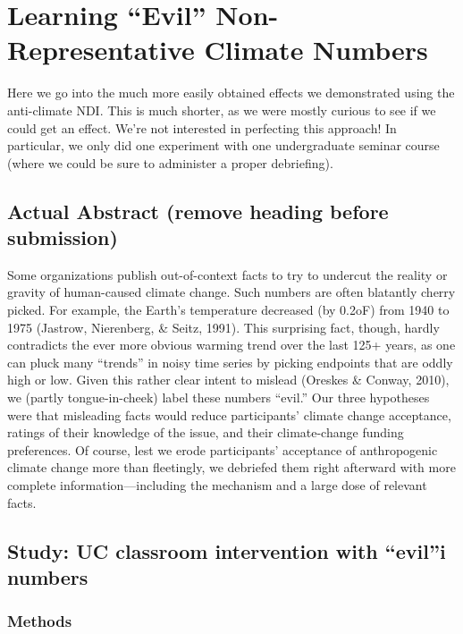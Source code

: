 \graphicspath{{evil-ndi/}}

\chapter{Learning \texorpdfstring{``Evil''}{"Evil"} Non-Representative Climate Numbers}
\label{chap:evilndi}

Here we go into the much more easily obtained effects we demonstrated using the
anti-climate NDI. This is much shorter, as we were mostly curious to see if we
could get an effect. We're not interested in perfecting this approach! In
particular, we only did one experiment with one undergraduate seminar course
(where we could be sure to administer a proper debriefing).

\section{Actual Abstract (remove heading before submission)}

Some organizations publish out-of-context facts to try to undercut the reality
or gravity of human-caused climate change. Such numbers are often blatantly
cherry picked. For example, the Earth’s temperature decreased (by 0.2oF) from
1940 to 1975 (Jastrow, Nierenberg, \& Seitz, 1991). This surprising fact, though,
hardly contradicts the ever more obvious warming trend over the last 125+ years,
as one can pluck many ``trends'' in noisy time series by picking endpoints that
are oddly high or low. Given this rather clear intent to mislead (Oreskes \&
Conway, 2010), we (partly tongue-in-cheek) label these numbers ``evil.'' Our three
hypotheses were that misleading facts would reduce participants’ climate change
acceptance, ratings of their knowledge of the issue, and their climate-change
funding preferences. Of course, lest we erode participants’ acceptance of
anthropogenic climate change more than fleetingly, we debriefed them right
afterward with more complete information––including the mechanism and a large
dose of relevant facts.

\section{Study: UC classroom intervention with \texorpdfstring{“evil”}{"evil"}i
    numbers}

\subsection{Methods} 


